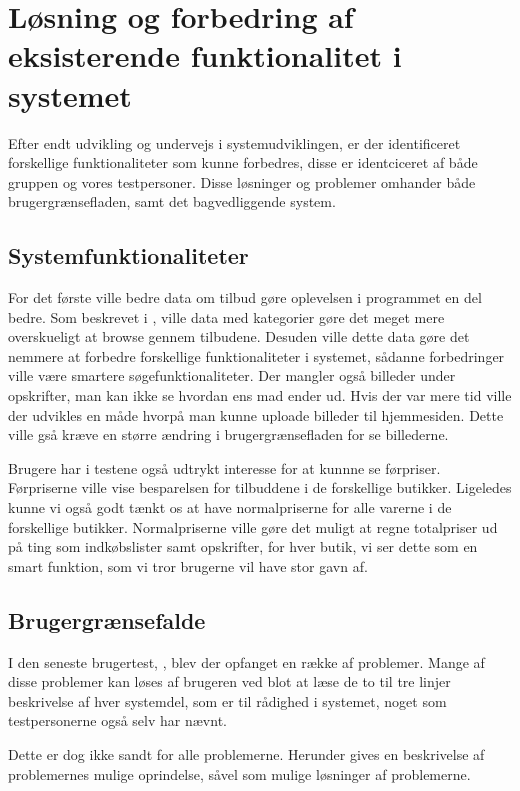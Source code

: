 \section{Løsning og forbedring af eksisterende funktionalitet i systemet}
Efter endt udvikling og undervejs i systemudviklingen, er der identificeret forskellige funktionaliteter som kunne forbedres, disse er identciceret af både gruppen og vores testpersoner.
Disse løsninger og problemer omhander både brugergrænsefladen, samt det bagvedliggende system.

\subsection{Systemfunktionaliteter}
For det første ville bedre data om tilbud gøre oplevelsen i programmet en del bedre.
Som beskrevet i , ville data med kategorier gøre det meget mere overskueligt at browse gennem tilbudene.
Desuden ville dette data gøre det nemmere at forbedre forskellige funktionaliteter i systemet, sådanne forbedringer ville være smartere søgefunktionaliteter.
Der mangler også billeder under opskrifter, man kan ikke se hvordan ens mad ender ud.
Hvis der var mere tid ville der udvikles en måde hvorpå man kunne uploade billeder til hjemmesiden. 
Dette ville gså kræve en større ændring i brugergrænsefladen for se billederne.

Brugere har i testene også udtrykt interesse for at kunnne se førpriser.
Førpriserne ville vise besparelsen for tilbuddene i de forskellige butikker.
Ligeledes kunne vi også godt tænkt os at have normalpriserne for alle varerne i de forskellige butikker.
Normalpriserne ville gøre det muligt at regne totalpriser ud på ting som indkøbslister samt opskrifter, for hver butik, vi ser dette som en smart funktion, som vi tror brugerne vil have stor gavn af.

\subsection{Brugergrænsefalde}
I den seneste brugertest, , blev der opfanget en række af problemer.
Mange af disse problemer kan løses af brugeren ved blot at læse de to til tre linjer beskrivelse af hver systemdel, som er til rådighed i systemet, noget som testpersonerne også selv har nævnt.

Dette er dog ikke sandt for alle problemerne.
Herunder gives en beskrivelse af problemernes mulige oprindelse, såvel som mulige løsninger af problemerne.

